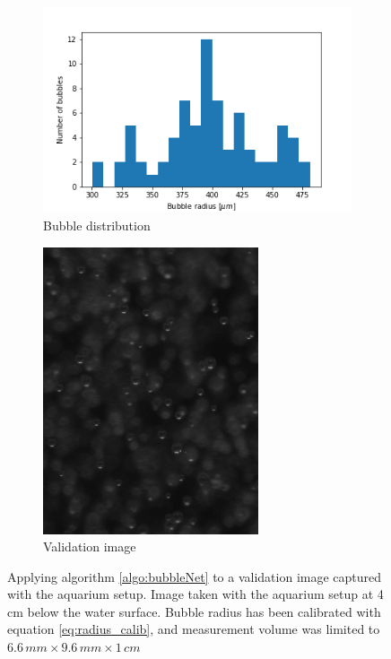				\begin{figure}[h!]
					\begin{subfigure}[t]{.4\textwidth}
						\includegraphics[scale=0.6]{graphs/b_val_0.png}
						\caption{Bubble distribution}
						\label{subfig:b_val_0}
					\end{subfigure}\hfill
					\begin{subfigure}[t]{.4\textwidth}
						\includegraphics[scale=0.6]{images/val_1.png}
						\caption{Validation image}
						\label{subfig:val_0}
					\end{subfigure}
					\caption{Applying algorithm \ref{algo:bubbleNet} to a validation image captured with the aquarium setup. Image taken with the aquarium setup at 4\,cm below the water surface. Bubble radius has been calibrated with equation \ref{eq:radius_calib}, and measurement volume was limited to $6.6\, mm \times 9.6 \, mm \times 1\, cm$}
					\label{bubb_dist_1}
				\end{figure}




